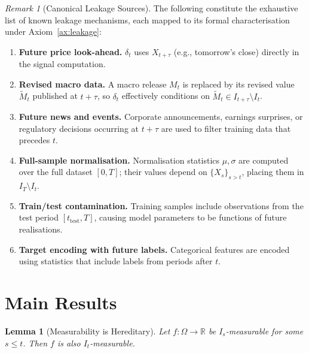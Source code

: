 \documentclass[12pt,openany]{book}
\newcommand{\calI}{\mathcal{I}}
\numberwithin{equation}{chapter}
\theoremstyle{plain}
\newtheorem{lemma}[theorem]{Lemma}
\theoremstyle{definition}
\theoremstyle{remark}
\newtheorem{remark}[theorem]{Remark}
\numberwithin{equation}{chapter}
\theoremstyle{plain}
\def\calI{I}%
\begin{document}
\begin{remark}[Canonical Leakage Sources]
\label{rem:leakage-sources}
The following constitute the exhaustive list of known leakage
mechanisms, each mapped to its formal characterisation
under Axiom~\ref{ax:leakage}:
\begin{enumerate}
  \item \textbf{Future price look-ahead.}
        $\delta_t$ uses $X_{t+\tau}$ (e.g., tomorrow's close)
        directly in the signal computation.
  \item \textbf{Revised macro data.}
        A macro release $M_t$ is replaced by its revised value
        $\tilde{M}_t$ published at $t + \tau$, so $\delta_t$
        effectively conditions on $\tilde{M}_t \in
        \calI_{t+\tau} \setminus \calI_t$.
  \item \textbf{Future news and events.}
        Corporate announcements, earnings surprises, or regulatory
        decisions occurring at $t + \tau$ are used to filter
        training data that precedes $t$.
  \item \textbf{Full-sample normalisation.}
        Normalisation statistics $\mu, \sigma$ are computed over
        the full dataset $[0, T]$; their values depend on
        $\{X_s\}_{s > t}$, placing them in
        $\calI_T \setminus \calI_t$.
  \item \textbf{Train/test contamination.}
        Training samples include observations from the test
        period $[t_{\mathrm{test}}, T]$, causing model parameters
        to be functions of future realisations.
  \item \textbf{Target encoding with future labels.}
        Categorical features are encoded using statistics that
        include labels from periods after $t$.
\end{enumerate}
\end{remark}

\section{Main Results}

\begin{lemma}[Measurability is Hereditary]
\label{lem:measurability-hereditary}
Let $f : \Omega \to \mathbb{R}$ be $\calI_s$-measurable for some
$s \leq t$.  Then $f$ is also $\calI_t$-measurable.
\end{lemma}
\end{document}
